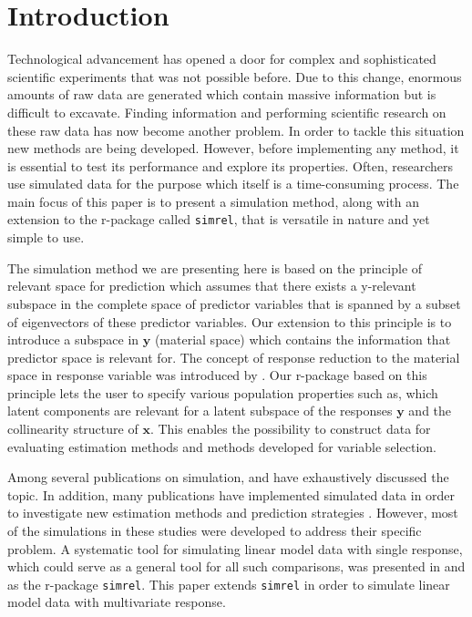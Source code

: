 \documentclass[3p,times,12pt,authoryear]{elsarticle}
\theoremstyle{definition}
\theoremstyle{definition}
\theoremstyle{remark}
\begin{document}
\section{Introduction}\label{introduction}

Technological advancement has opened a door for complex and
sophisticated scientific experiments that was not possible before. Due
to this change, enormous amounts of raw data are generated which contain
massive information but is difficult to excavate. Finding information
and performing scientific research on these raw data has now become
another problem. In order to tackle this situation new methods are being
developed. However, before implementing any method, it is essential to
test its performance and explore its properties. Often, researchers use
simulated data for the purpose which itself is a time-consuming process.
The main focus of this paper is to present a simulation method, along
with an extension to the r-package called \texttt{simrel}, that is
versatile in nature and yet simple to use.

The simulation method we are presenting here is based on the principle
of relevant space for prediction \citep{helland1994comparison} which
assumes that there exists a y-relevant subspace in the complete space of
predictor variables that is spanned by a subset of eigenvectors of these
predictor variables. Our extension to this principle is to introduce a
subspace in \(\mathbf{y}\) (material space) which contains the
information that predictor space is relevant for. The concept of
response reduction to the material space in response variable was
introduced by \citet{cook2010envelope}. Our r-package based on this
principle lets the user to specify various population properties such
as, which latent components are relevant for a latent subspace of the
responses \(\mathbf{y}\) and the collinearity structure of
\(\mathbf{x}\). This enables the possibility to construct data for
evaluating estimation methods and methods developed for variable
selection.

Among several publications on simulation, \citet{ripley2009stochastic}
and \citet{gamerman2006markov} have exhaustively discussed the topic. In
addition, many publications have implemented simulated data in order to
investigate new estimation methods and prediction strategies
\citep[see:][]{cook2015simultaneous, cook2013envelopes, helland2012near}.
However, most of the simulations in these studies were developed to
address their specific problem. A systematic tool for simulating linear
model data with single response, which could serve as a general tool for
all such comparisons, was presented in \citet{saebo2015simrel} and as
the r-package \texttt{simrel}. This paper extends \texttt{simrel} in
order to simulate linear model data with multivariate response.
\end{document}
